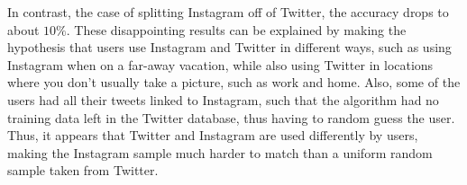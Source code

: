 In contrast, the case of splitting Instagram off of Twitter, the accuracy drops to about $10\%$. These disappointing results can be explained by making the hypothesis that users use Instagram and Twitter in different ways, such as using Instagram when on a far-away vacation, while also using Twitter in locations where you don't usually take a picture, such as work and home. Also, some of the users had all their tweets linked to Instagram, such that the algorithm had no training data left in the Twitter database, thus having to random guess the user. Thus, it appears that Twitter and Instagram are used differently by users, making the Instagram sample much harder to match than a uniform random sample taken from Twitter.
